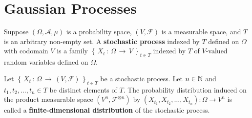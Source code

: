 

\section{Gaussian Processes}
\setcounter{theorem}{0}
\setcounter{equation}{0}

\begin{definition}
\mbox{}\vskip 0cm
\noindent
Suppose $\left(\Omega,\mathcal{A},\mu\right)$ is a probability space,
$\left(V,\mathcal{F}\right)$ is a measurable space, and 
$T$ is an arbitrary non-empty set.
A \textbf{stochastic process} indexed by $T$ defined on $\Omega$ with codomain $V$
is a family $\left\{\,X_{t}\,:\,\Omega\,\longrightarrow\,V\,\right\}_{t \in T}$
indexed by $T$ of $V$-valued random variables defined on $\Omega$.
\end{definition}

\begin{definition}
\mbox{}\vskip 0cm
\noindent
Let $\left\{\,X_{t}\,:\,\Omega\,\longrightarrow\,(V,\mathcal{F})\,\right\}_{t \in T}$ be a stochastic process.
Let $n \in \mathbb{N}$ and $t_{1},t_{2},\ldots,t_{n} \in T$ be distinct elements of $T$.
The probability distribution induced on the product measurable space
$\left(V^{n},\mathcal{F}^{\otimes n}\right)$
by $\left(X_{t_{1}},X_{t_{2}},\ldots,X_{t_{n}}\right):\Omega\longrightarrow V^{n}$
is called a \textbf{finite-dimensional distribution} of the stochastic process.
\end{definition}

